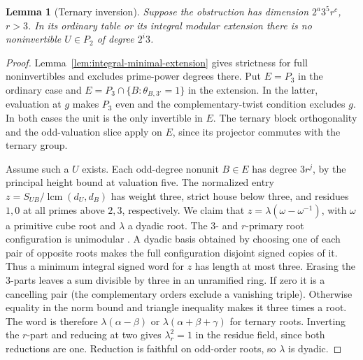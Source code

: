\documentclass[11pt,a4paper]{article}
\numberwithin{equation}{section}
\newtheorem{lemma}[theorem]{Lemma}
\theoremstyle{remark}
\newcommand{\lcm}{\operatorname{lcm}}
\begin{document}
\begin{lemma}[Ternary inversion]\label{short:ternary-inversion}
Suppose the obstruction has dimension $2^a3^5r^c$, $r>3$.
In its ordinary table or its integral modular extension there is
no noninvertible
$U\in P_2$ of degree $2^i3$.
\end{lemma}
\begin{proof}
Lemma~\ref{lem:integral-minimal-extension} gives strictness for
full noninvertibles and excludes prime-power degrees there.
Put $E=P_3$ in the ordinary case and
$E=P_3\cap\{B:\theta_{B,3'}=1\}$ in the extension. In the latter,
evaluation at $g$ makes $P_3$ even and the complementary-twist
condition excludes $g$. In both cases the unit is the only
invertible in $E$. The ternary block orthogonality and the
odd-valuation slice apply on $E$, since its projector commutes
with the ternary group.

Assume such a $U$ exists. Each odd-degree nonunit $B\in E$ has
degree $3r^j$, by the principal height bound at valuation five.
The normalized entry $z=S_{UB}/\lcm(d_U,d_B)$ has weight three,
strict house below three, and residues $1,0$ at all primes above
$2,3$, respectively. We claim that
$z=\lambda(\omega-\omega^{-1})$, with $\omega$ a primitive cube
root and $\lambda$ a dyadic root. The $3$- and $r$-primary root
configuration is unimodular \cite[Theorems~3 and~13]{BH}. A dyadic
basis obtained by choosing one of each pair of opposite roots makes
the full configuration disjoint signed copies of it. Thus a minimum
integral signed word for $z$ has length at most three. Erasing the
$3$-parts leaves a sum divisible by three in an unramified ring.
If zero it is a cancelling pair (the complementary orders exclude
a vanishing triple). Otherwise equality in the norm bound and
triangle inequality makes it three times a root. The word is
therefore $\lambda(\alpha-\beta)$ or
$\lambda(\alpha+\beta+\gamma)$ for ternary roots. Inverting the $r$-part and reducing at two gives
$\lambda_r^{2}=1$ in the residue field, since both reductions are
one. Reduction is faithful on odd-order roots, so $\lambda$ is dyadic.


\end{proof}
\end{document}
